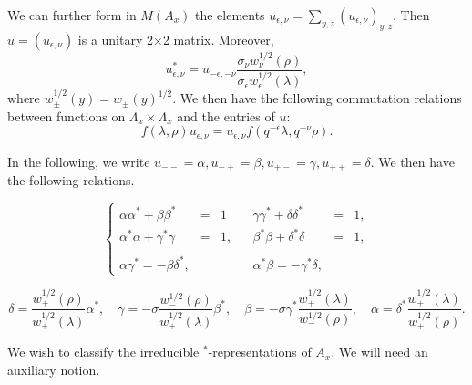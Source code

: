 We can further form in $M(A_x)$ the elements $u_{\epsilon,\nu} = \sum_{y,z} (u_{\epsilon,\nu})_{y,z}$. Then $u=(u_{\epsilon,\nu})$ is a unitary 2$\times$2 matrix. Moreover, \begin{equation}\label{EqAdju}u_{\epsilon,\nu}^* = u_{-\epsilon,-\nu}\frac{ \sigma_{\nu}w_{\nu}^{1/2}(\rho)}{\sigma_{\epsilon}w_{\epsilon}^{1/2}(\lambda)} ,\end{equation} where $w_{\pm}^{1/2}(y) = w_{\pm}(y)^{1/2}$.  We then have the following commutation relations between functions on $\Lambda_x\times \Lambda_x$ and the entries of $u$: \begin{equation}\label{EqGradu} f(\lambda,\rho)u_{\epsilon,\nu} = u_{\epsilon,\nu}f(q^{-\epsilon}\lambda,q^{-\nu}\rho).\end{equation}

In the following, we write $u_{--}=\alpha, u_{-+}= \beta, u_{+-}=\gamma,u_{++}=\delta$. We then have the following relations.


\[\left\{\begin{array}{lllllll} \alpha\alpha^* + \beta\beta^* &=& 1 &&  \gamma\gamma^* + \delta\delta^* &=& 1,\\ \alpha^*\alpha+ \gamma^*\gamma &=&1,&&\beta^*\beta+ \delta^*\delta &=& 1,\\ \\ \alpha \gamma^* = -\beta \delta^*, &&&& \alpha^*\beta = -\gamma^*\delta, \end{array}\right.\]

\[ \delta =  \frac{w_+^{1/2}(\rho)}{w_+^{1/2}(\lambda)}\alpha^*, \quad \gamma=  -\sigma \frac{w_{-}^{1/2}(\rho)}{w_+^{1/2}(\lambda)}\beta^*,\quad  \beta = -\sigma \gamma^*\frac{w_+^{1/2}(\lambda)}{w_{-}^{1/2}(\rho)}, \quad  \alpha = \delta^* \frac{w_+^{1/2}(\lambda)}{w_+^{1/2}(\rho)}.\]


We wish to classify the irreducible $^*$-representations of $A_x$. We will need an auxiliary notion.



